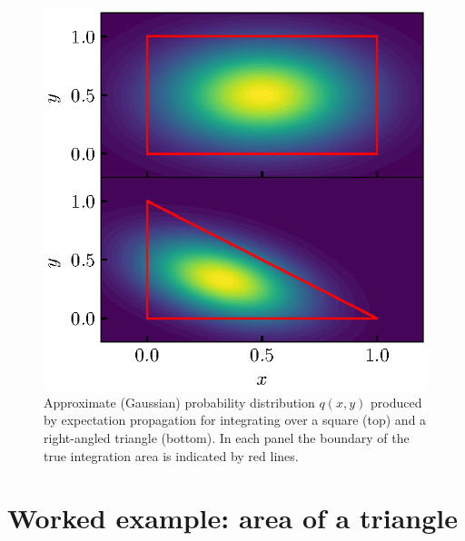 \documentclass[11pt,twoside]{report}
\begin{document}
\begin{figure}
  \includegraphics[width=0.9\linewidth,outer]{ep-pdf}
  \caption[Approximate probability distribution for integrating areas of simple 2d shapes]{
    Approximate (Gaussian) probability distribution $q(x,y)$ produced by expectation propagation for integrating over a square (top) and a right-angled triangle (bottom).
    In each panel the boundary of the true integration area is indicated by red lines.
  }
  \label{fig:ep-pdf}
\end{figure}

\section{Worked example: area of a triangle}
\end{document}

